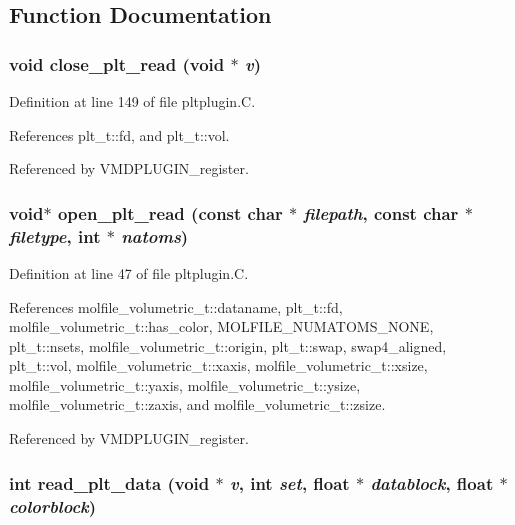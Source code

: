 \subsection{Function Documentation}
\subsubsection{\setlength{\rightskip}{0pt plus 5cm}void close\_\-plt\_\-read (void $\ast$ {\em v})\hspace{0.3cm}{\tt  [static]}}\label{pltplugin_8C_a4}




Definition at line 149 of file pltplugin.C.

References plt\_\-t::fd, and plt\_\-t::vol.

Referenced by VMDPLUGIN\_\-register.
\subsubsection{\setlength{\rightskip}{0pt plus 5cm}void$\ast$ open\_\-plt\_\-read (const char $\ast$ {\em filepath}, const char $\ast$ {\em filetype}, int $\ast$ {\em natoms})\hspace{0.3cm}{\tt  [static]}}\label{pltplugin_8C_a1}




Definition at line 47 of file pltplugin.C.

References molfile\_\-volumetric\_\-t::dataname, plt\_\-t::fd, molfile\_\-volumetric\_\-t::has\_\-color, MOLFILE\_\-NUMATOMS\_\-NONE, plt\_\-t::nsets, molfile\_\-volumetric\_\-t::origin, plt\_\-t::swap, swap4\_\-aligned, plt\_\-t::vol, molfile\_\-volumetric\_\-t::xaxis, molfile\_\-volumetric\_\-t::xsize, molfile\_\-volumetric\_\-t::yaxis, molfile\_\-volumetric\_\-t::ysize, molfile\_\-volumetric\_\-t::zaxis, and molfile\_\-volumetric\_\-t::zsize.

Referenced by VMDPLUGIN\_\-register.
\subsubsection{\setlength{\rightskip}{0pt plus 5cm}int read\_\-plt\_\-data (void $\ast$ {\em v}, int {\em set}, float $\ast$ {\em datablock}, float $\ast$ {\em colorblock})\hspace{0.3cm}{\tt  [static]}}\label{pltplugin_8C_a3}




